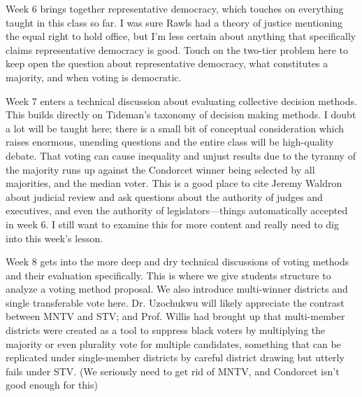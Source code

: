 Week 6 brings together representative democracy, which touches on everything taught in this class so far.  I was sure Rawls had a theory of justice mentioning the equal right to hold office, but I'm less certain about anything that specifically claims representative democracy is good.  Touch on the two-tier problem here to keep open the question about representative democracy, what constitutes a majority, and when voting is democratic.

Week 7 enters a technical discussion about evaluating collective decision methods.  This builds directly on Tideman's taxonomy of decision making methods.  I doubt a lot will be taught here; there is a small bit of conceptual consideration which raises enormous, unending questions and the entire class will be high-quality debate.  That voting can cause inequality and unjust results due to the tyranny of the majority runs up against the Condorcet winner being selected by all majorities, and the median voter.  This is a good place to cite Jeremy Waldron about judicial review and ask questions about the authority of judges and executives, and even the authority of legislators—things automatically accepted in week 6.  I still want to examine this for more content and really need to dig into this week's lesson.

Week 8 gets into the more deep and dry technical discussions of voting methods and their evaluation specifically.  This is where we give students structure to analyze a voting method proposal.  We also introduce multi-winner districts and single transferable vote here.  Dr. Uzochukwu will likely appreciate the contrast between MNTV and STV; and Prof. Willis had brought up that multi-member districts were created as a tool to suppress black voters by multiplying the majority or even plurality vote for multiple candidates, something that can be replicated under single-member districts by careful district drawing but utterly fails under STV.  (We seriously need to get rid of MNTV, and Condorcet isn't good enough for this)

